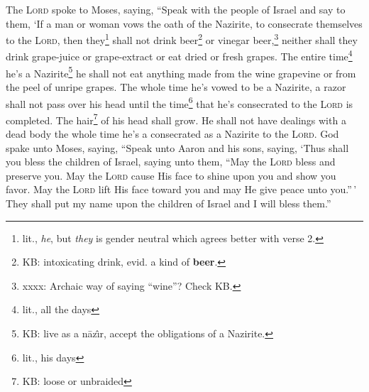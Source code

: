 
\begin{enumerate*}[mode=unboxed]
     The \textsc{Lord} spoke to Moses, saying,%
     ``Speak with the people of Israel and say to them, `If a man or woman vows the oath of the Nazirite, to consecrate themselves to the \textsc{Lord},%
     then they\footnote{lit., \textit{he}, but \textit{they} is gender neutral which agrees better with verse 2.} shall not drink beer\footnote{KB: intoxicating drink, evid\@. a kind of \textbf{beer}.} or vinegar beer,\footnote{xxxx: Archaic way of saying ``wine''? Check KB.} neither shall they drink grape-juice or grape-extract or eat dried or fresh grapes.%
     The entire time\footnote{lit., all the days} he's a Nazirite\footnote{KB: live as a n\=az\^\i{}r, accept the obligations of a Nazirite.} he shall not eat anything made from the wine grapevine or from the peel of unripe grapes.%
     The whole time he's vowed to be a Nazirite, a razor shall not pass over his head until the time\footnote{lit., his days} that he's consecrated to the \textsc{Lord} is completed. The hair\footnote{KB: loose or unbraided} of his head shall grow.%
     He shall not have dealings with a dead body the whole time he's a consecrated as a Nazirite to the \textsc{Lord}.%
     God spake unto Moses, saying,%
     ``Speak unto Aaron and his sons, saying, `Thus shall you bless the children of Israel, saying unto them,%
     ``May the \textsc{Lord} bless and preserve you.%
     May the \textsc{Lord} cause His face to shine upon you and show you favor.%
     May the \textsc{Lord} lift His face toward you and may He give peace unto you.''\,'%
     They shall put my name upon the children of Israel and I will bless them.''%
\end{enumerate*}
